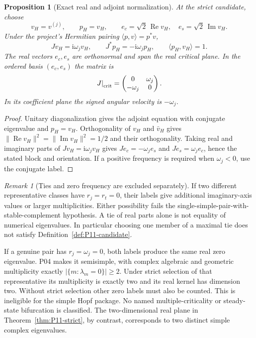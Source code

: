 \documentclass[11pt]{article}
\newcommand{\ii}{\mathrm{i}}
\newcommand{\inner}[2]{\langle #1,#2\rangle}
\DeclareMathOperator{\Ree}{Re}
\DeclareMathOperator{\Imm}{Im}
\newtheorem{proposition}[theorem]{Proposition}
\theoremstyle{definition}
\theoremstyle{remark}
\newtheorem{remark}[theorem]{Remark}
\begin{document}
\begin{proposition}[Exact real and adjoint normalization]
\label{prop:P11-vectors}
At the strict candidate, choose
\begin{equation}
 v_H=v^{(j)},\qquad p_H=v_H,\qquad
 e_c=\sqrt2\,\Ree v_H,\quad e_s=\sqrt2\,\Imm v_H.
 \label{eq:P11-vectors}
\end{equation}
Under the project's Hermitian pairing $\inner{p}{v}=p^*v$,
\begin{equation}
 Jv_H=\ii\omega_jv_H,\qquad
 J^*p_H=-\ii\omega_jp_H,\qquad \inner{p_H}{v_H}=1.
 \label{eq:P11-adjoint}
\end{equation}
The real vectors $e_c,e_s$ are orthonormal and span the real critical
plane. In the ordered basis $(e_c,e_s)$ the matrix is
\begin{equation}
 \left.J\right|_{\rm crit}=
 \begin{pmatrix}0&\omega_j\\-\omega_j&0\end{pmatrix}.
 \label{eq:P11-real-block}
\end{equation}
In its coefficient plane the signed angular velocity is $-\omega_j$.
\end{proposition}
\begin{proof}
Unitary diagonalization gives the adjoint equation with conjugate
eigenvalue and $p_H=v_H$. Orthogonality of $v_H$ and $\bar v_H$
gives $\|\Ree v_H\|^2=\|\Imm v_H\|^2=1/2$ and their orthogonality.
Taking real and imaginary parts of $Jv_H=\ii\omega_jv_H$ gives
$Je_c=-\omega_je_s$ and $Je_s=\omega_je_c$, hence the stated block
and orientation. If a positive frequency is required when $\omega_j<0$,
use the conjugate label.
\end{proof}

\begin{remark}[Ties and zero frequency are excluded separately]
\label{rem:P11-degeneracies}
If two different representative classes have $r_j=r_t=0$, their
labels give additional imaginary-axis values or larger multiplicities.
Either possibility fails the single-simple-pair-with-stable-complement
hypothesis. A tie of real parts alone is not equality of numerical
eigenvalues. In particular choosing one member of a maximal tie does
not satisfy Definition~\ref{def:P11-candidate}.

If a genuine pair has $r_j=\omega_j=0$, both labels produce the
same real zero eigenvalue. P04 makes it semisimple, with complex
algebraic and geometric multiplicity exactly
$|\{m:\lambda_m=0\}|\ge2$. Under strict selection of that
representative its multiplicity is exactly two and its real kernel
has dimension two. Without strict selection other zero labels must
also be counted. This is ineligible for the simple Hopf package.
No named multiple-criticality or steady-state bifurcation is classified.
The two-dimensional real plane in Theorem~\ref{thm:P11-strict}, by
contrast, corresponds to two distinct simple complex eigenvalues.
\end{remark}
\end{document}
